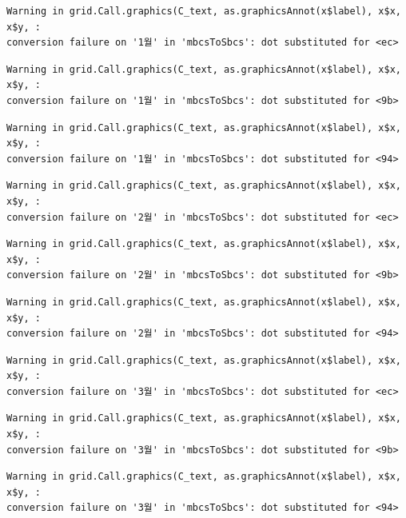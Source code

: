 \documentclass[
  letterpaper,
  DIV=11,
  numbers=noendperiod]{scrreprt}
\begin{document}
\begin{verbatim}
Warning in grid.Call.graphics(C_text, as.graphicsAnnot(x$label), x$x, x$y, :
conversion failure on '1월' in 'mbcsToSbcs': dot substituted for <ec>
\end{verbatim}

\begin{verbatim}
Warning in grid.Call.graphics(C_text, as.graphicsAnnot(x$label), x$x, x$y, :
conversion failure on '1월' in 'mbcsToSbcs': dot substituted for <9b>
\end{verbatim}

\begin{verbatim}
Warning in grid.Call.graphics(C_text, as.graphicsAnnot(x$label), x$x, x$y, :
conversion failure on '1월' in 'mbcsToSbcs': dot substituted for <94>
\end{verbatim}

\begin{verbatim}
Warning in grid.Call.graphics(C_text, as.graphicsAnnot(x$label), x$x, x$y, :
conversion failure on '2월' in 'mbcsToSbcs': dot substituted for <ec>
\end{verbatim}

\begin{verbatim}
Warning in grid.Call.graphics(C_text, as.graphicsAnnot(x$label), x$x, x$y, :
conversion failure on '2월' in 'mbcsToSbcs': dot substituted for <9b>
\end{verbatim}

\begin{verbatim}
Warning in grid.Call.graphics(C_text, as.graphicsAnnot(x$label), x$x, x$y, :
conversion failure on '2월' in 'mbcsToSbcs': dot substituted for <94>
\end{verbatim}

\begin{verbatim}
Warning in grid.Call.graphics(C_text, as.graphicsAnnot(x$label), x$x, x$y, :
conversion failure on '3월' in 'mbcsToSbcs': dot substituted for <ec>
\end{verbatim}

\begin{verbatim}
Warning in grid.Call.graphics(C_text, as.graphicsAnnot(x$label), x$x, x$y, :
conversion failure on '3월' in 'mbcsToSbcs': dot substituted for <9b>
\end{verbatim}

\begin{verbatim}
Warning in grid.Call.graphics(C_text, as.graphicsAnnot(x$label), x$x, x$y, :
conversion failure on '3월' in 'mbcsToSbcs': dot substituted for <94>
\end{verbatim}
\end{document}
